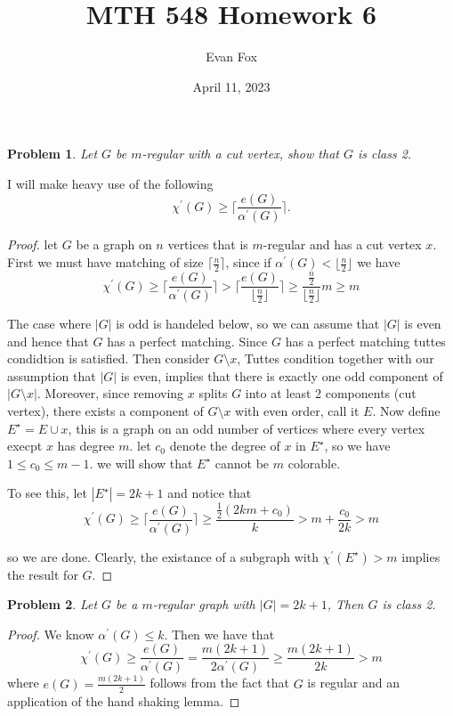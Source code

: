 \documentclass{article}
\title{MTH 548 Homework 6}
\author{Evan Fox}
\date{April 11, 2023}
\newtheorem{prb}{Problem}
\begin{document}
\maketitle
\begin{prb} Let $G$ be $m$-regular with a cut vertex, show that $G$ is class 2. \end{prb} 

\noindent I will make heavy use of the following
\[
	\chi^\prime(G) \geq \lceil \frac{e(G)}{\alpha^\prime(G)} \rceil . 
\]
\begin{proof}
	let $G$ be a graph on $n$ vertices that is $m$-regular and has a cut vertex $x$. 
	First we must have matching of size $\Big\lceil \tfrac{n}{2} \Big\rceil$, since if $\alpha^\prime(G) < \lfloor \frac{n}{2} \rfloor$ we have 
	\[    	
	\chi^\prime(G) \geq \Big\lceil \frac{e(G)}{\alpha^\prime(G)} \Big\rceil > \Big\lceil \frac{e(G)}{\lfloor \tfrac{n}{2} \rfloor} \Big\rceil \geq 
	\frac{\tfrac{n}{2}}{\lfloor \tfrac{n}{2} \rfloor} m \geq m
	\]

	\noindent The case where $|G|$ is odd is handeled below, so we can assume that $|G|$ is even and hence that $G$ has a perfect matching.
	Since $G$ has a perfect matching tuttes condidtion is satisfied. 
	Then consider $G \setminus x$, Tuttes condition together
	with our assumption that $|G|$ is even, implies that there is exactly one odd component of $|G \setminus x|$. Moreover, since removing $x$ 
	splits $G$ into	at least 2 components (cut vertex), there exists a component of $G \setminus x$ with even order, call it $E$. 
	Now define $E^\star = E \cup x$, this is a graph on an odd number of vertices where every vertex execpt $x$ has degree $m$. 
	let $c_0$ denote the degree of $x$ in $E^\star$, so we have $1 \leq c_0 \leq m-1$. we will show that $E^\star$ cannot be $m$ colorable. 

	
\noindent	To see this, let $|E^\star| = 2k + 1$ and notice that 
	\[
		\chi^\prime(G) \geq  \Big\lceil \frac{e(G)}{\alpha^\prime(G)} \Big\rceil \geq \frac{\frac{1}{2} (2km + c_0)}{k} > m + \frac{c_0}{2k} > m 
	\]

	\noindent so we are done. Clearly, the existance of a subgraph with $\chi^\prime(E^\star) > m$ implies the result for $G$.  
\end{proof} 



\begin{prb} Let $G$ be a $m$-regular graph with $|G| = 2k + 1$, Then $G$ is class 2.  \end{prb} 
\begin{proof}  
	We know $\alpha^\prime(G) \leq k$. 
	Then we have that 
	\[
		\chi^\prime(G) \geq \frac{e(G)}{\alpha^\prime(G)}  = \frac{m(2k+1)}{2\alpha^\prime(G)} \geq \frac{m(2k+1)}{2k} > m 
	\]
	where $e(G) = \frac{m(2k+1)}{2} $ follows from the fact that $G$ is regular and an application of the hand shaking lemma. 

\end{proof} 	    
\end{document}

